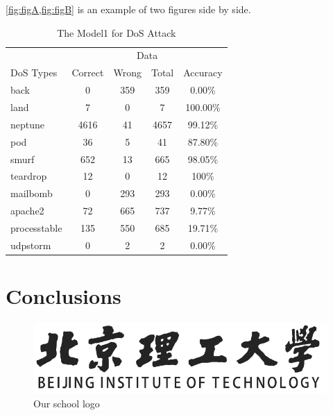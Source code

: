 \documentclass[12pt,english, openany]{book}
\begin{document}
	\cref{fig:figA,fig:figB} is an example of two figures side by side.
	 
	\begin{table}[h]
		\centering
		\begin{tabular}{lcccc}
			\toprule
			& \multicolumn{4}{c}{Data} \\ \cmidrule(lr){2-5}
			DoS Types & Correct &  Wrong & Total & Accuracy \\
			\midrule
			back & 0 & 359 & 359 & 0.00\% \\
			land & 7 & 0 & 7 & 100.00\% \\
			neptune & 4616 & 41 & 4657 & 99.12\% \\
			pod & 36 & 5 & 41 & 87.80\% \\
			smurf & 652 & 13 & 665 & 98.05\% \\
			teardrop & 12 & 0 & 12 & 100\% \\
			mailbomb & 0 & 293 & 293 & 0.00\% \\
			apache2 & 72 & 665 & 737 & 9.77\% \\
			processtable & 135 & 550 & 685 & 19.71\% \\
			udpstorm & 0 & 2 & 2 & 0.00\% \\
			\bottomrule
		\end{tabular}
		\caption{The Model1 for DoS Attack}
		\label{tab-label}
	\end{table}
	\lipsum[6-9]
	
	\chapter{Conclusions}
	
	\lipsum[2]
	\begin{figure}[h]
		\centering
		\includegraphics[width=0.6\linewidth]{Figures/logo_slogan}
		\caption{Our school logo}
		\label{fig:logoslogan}
	\end{figure}
	
	
	\lipsum[3-5]
	
	\pagebreak
	
	\renewcommand{\bibname}{References}
	
	
	
\end{document}
